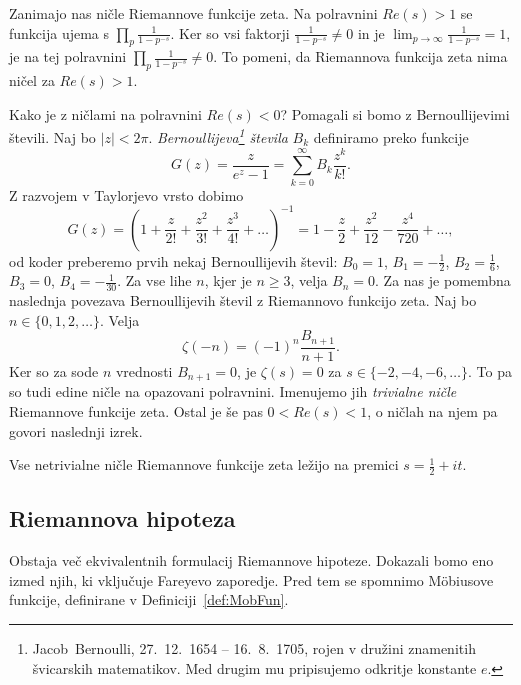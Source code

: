 \documentclass[mat1]{fmfdelo}
\begin{document}
Zanimajo nas ničle Riemannove funkcije zeta. Na polravnini $Re(s)>1$ se funkcija ujema s $\prod_{p}\frac{1}{1-p^{-s}}$. Ker so vsi faktorji $\frac{1}{1-p^{-s}} \neq 0$ in je $\lim_{p\to\infty} \frac{1}{1-p^{-s}} = 1$, je na tej polravnini $\prod_{p}\frac{1}{1-p^{-s}} \neq 0$. To pomeni, da Riemannova funkcija zeta nima ničel za $Re(s)>1$.

Kako je z ničlami na polravnini $Re(s)<0$?
Pomagali si bomo z Bernoullijevimi števili. Naj bo $|z|<2\pi$. \emph{Bernoullijeva\footnote{Jacob~Bernoulli, 27.~12.~1654 -- 16.~8.~1705, rojen v družini znamenitih švicarskih matematikov. Med drugim mu pripisujemo odkritje konstante $e$.} števila} $B_{k}$ definiramo preko funkcije
\begin{equation}
G(z) = \frac{z}{e^z-1} = \sum_{k=0}^{\infty} B_{k} \frac{z^k}{k!}.
\end{equation}
Z razvojem v Taylorjevo vrsto dobimo
\[ G(z) = \left(1 + \frac{z}{2!} + \frac{z^2}{3!} + \frac{z^3}{4!} + \ldots \right)^{-1} = 1 - \frac{z}{2} + \frac{z^2}{12} - \frac{z^4}{720} + \ldots, \]
od koder preberemo prvih nekaj Bernoullijevih števil: $B_{0} = 1$, $B_{1} = -\frac{1}{2}$,  $B_{2} = \frac{1}{6}$,  $B_{3} = 0$, $B_{4} = -\frac{1}{30}$.
Za vse lihe $n$, kjer je $n \geq 3$, velja $B_{n}=0$. 
Za nas je pomembna naslednja povezava Bernoullijevih števil z Riemannovo funkcijo zeta. Naj bo $n\in\{0, 1, 2, \dots\}$. Velja
\begin{equation}
	\zeta(-n) = (-1)^n \frac{B_{n+1}}{n+1}.
\end{equation}
Ker so za sode $n$ vrednosti $B_{n+1}=0$, je $\zeta(s)=0$ za $s\in\{-2,-4,-6,\dots\}$. To pa so tudi edine ničle na opazovani polravnini. Imenujemo jih \emph{trivialne ničle} Riemannove funkcije zeta. Ostal je še pas $0<Re(s)<1$, o ničlah na njem pa govori naslednji izrek. 

\begin{izrek}
Vse netrivialne ničle Riemannove funkcije zeta ležijo na premici $s=\frac{1}{2}+it$.
\end{izrek}

\subsection{Riemannova hipoteza}

Obstaja več ekvivalentnih formulacij Riemannove hipoteze. Dokazali bomo eno izmed njih, ki vključuje Fareyevo zaporedje. Pred tem se spomnimo M\"obiusove funkcije, definirane v Definiciji~\ref{def:MobFun}.
\end{document}
